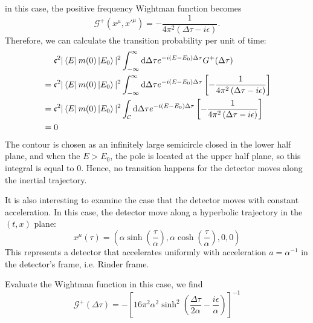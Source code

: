 \documentclass[12pt]{article}
\numberwithin{equation}{section}
\theoremstyle{1style}
\newcommand{\id}{\mathrm{d}}
\begin{document}
in this case, the positive frequency Wightman function becomes
\begin{equation}
  \mathcal{G}^+(x^{\mu},x'^{\mu})=-\frac{1}{4\pi^2\left(\Delta\tau -i\epsilon\right)}.
\end{equation}
Therefore, we can calculate the transition probability per unit of time:
\begin{align}
   & ~~~~\mathfrak{c}^2|\bra{E}m(0)\ket{E_0}|^2\int_{-\infty}^{\infty}\id \Delta\tau e^{-i(E-E_0)\Delta \tau}G^+(\Delta \tau) \\
   & = \mathfrak{c}^2|\bra{E}m(0)\ket{E_0}|^2\int_{-\infty}^{\infty}\id \Delta\tau e^{-i(E-E_0)\Delta \tau}
  \left[-\frac{1}{4\pi^2\left(\Delta\tau -i\epsilon\right)}\right]                                                            \\
   & = \mathfrak{c}^2|\bra{E}m(0)\ket{E_0}|^2\int_{\mathcal{C}}\id \Delta\tau e^{-i(E-E_0)\Delta \tau}
  \left[-\frac{1}{4\pi^2\left(\Delta\tau -i\epsilon\right)}\right]                                                            \\
   & = 0
\end{align}
The contour is chosen as an infinitely large semicircle closed in the lower half plane, and when the \(E>E_0\),
the pole is located at the upper half plane, so this integral is equal to \(0\).
Hence, no transition happens for the detector moves along the inertial trajectory.

\bigskip

It is also interesting to examine the case that the detector moves with constant acceleration.
In this case, the detector move along a hyperbolic trajectory in the \((t,x)\) plane:
\begin{equation}
  x^{\mu}(\tau)=\left(\alpha\sinh(\frac{\tau}{\alpha}),\alpha \cosh(\frac{\tau}{\alpha}),0,0 \right)
\end{equation}
This represents a detector that accelerates uniformly with acceleration \(a=\alpha^{-1}\) in the detector's frame, i.e. Rinder frame.


Evaluate the Wightman function in this case, we find
\begin{equation}\label{2325}
  \mathcal{G}^+(\Delta\tau)=-\left[16\pi^2\alpha^2\sinh^2\left(\frac{\Delta\tau}{2\alpha}-\frac{i\epsilon}{\alpha}\right)\right]^{-1}
\end{equation}
\end{document}
